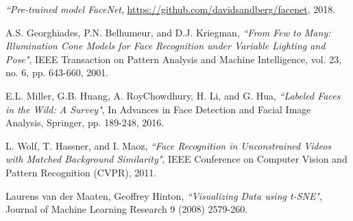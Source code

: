 \textit{``Pre-trained model FaceNet},
\url{https://github.com/davidsandberg/facenet}, 2018.


A.S. Georghiades, P.N. Belhumeur, and D.J. Kriegman,
\textit{``From Few to Many: Illumination Cone Models for Face Recognition under Variable Lighting and Pose"},
IEEE Transaction on Pattern Analysis and Machine Intelligence,
vol. 23, no. 6, pp. 643-660, 2001.

E.L. Miller, G.B. Huang, A. RoyChowdhury, H. Li, and G. Hua,
\textit{``Labeled Faces in the Wild: A Survey"},
In Advances in Face Detection and Facial Image Analysis, Springer,
pp. 189-248, 2016.

L. Wolf, T. Hassner, and I. Maoz,
\textit{``Face Recognition in Unconstrained Videos with Matched Background Similarity"},
IEEE Conference on Computer Vision and Pattern Recognition (CVPR), 2011.


Laurens van der Maaten, Geoffrey Hinton,
\textit{``Visualizing Data using t-SNE"},
Journal of Machine Learning Research 9 (2008) 2579-260.

